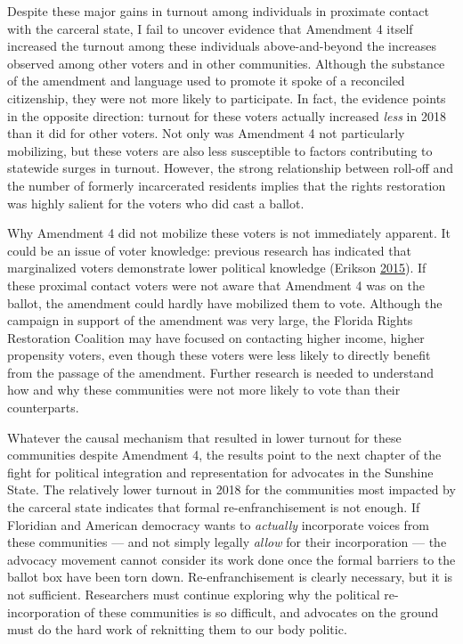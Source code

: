 \documentclass[
  12pt,
]{article}
\begin{document}
Despite these major gains in turnout among individuals in proximate contact with the carceral state, I fail to uncover evidence that Amendment 4 itself increased the turnout among these individuals above-and-beyond the increases observed among other voters and in other communities. Although the substance of the amendment and language used to promote it spoke of a reconciled citizenship, they were not more likely to participate. In fact, the evidence points in the opposite direction: turnout for these voters actually increased \emph{less} in 2018 than it did for other voters. Not only was Amendment 4 not particularly mobilizing, but these voters are also less susceptible to factors contributing to statewide surges in turnout. However, the strong relationship between roll-off and the number of formerly incarcerated residents implies that the rights restoration was highly salient for the voters who did cast a ballot.

Why Amendment 4 did not mobilize these voters is not immediately apparent. It could be an issue of voter knowledge: previous research has indicated that marginalized voters demonstrate lower political knowledge (Erikson \protect\hyperlink{ref-Erikson2015}{2015}). If these proximal contact voters were not aware that Amendment 4 was on the ballot, the amendment could hardly have mobilized them to vote. Although the campaign in support of the amendment was very large, the Florida Rights Restoration Coalition may have focused on contacting higher income, higher propensity voters, even though these voters were less likely to directly benefit from the passage of the amendment. Further research is needed to understand how and why these communities were not more likely to vote than their counterparts.

Whatever the causal mechanism that resulted in lower turnout for these communities despite Amendment 4, the results point to the next chapter of the fight for political integration and representation for advocates in the Sunshine State. The relatively lower turnout in 2018 for the communities most impacted by the carceral state indicates that formal re-enfranchisement is not enough. If Floridian and American democracy wants to \emph{actually} incorporate voices from these communities --- and not simply legally \emph{allow} for their incorporation --- the advocacy movement cannot consider its work done once the formal barriers to the ballot box have been torn down. Re-enfranchisement is clearly necessary, but it is not sufficient. Researchers must continue exploring why the political re-incorporation of these communities is so difficult, and advocates on the ground must do the hard work of reknitting them to our body politic.
\end{document}
